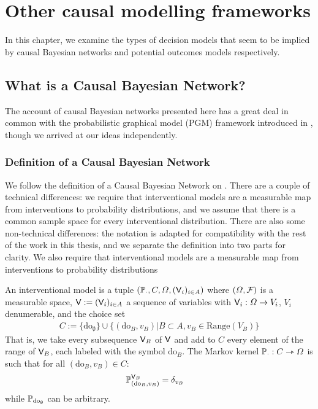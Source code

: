 
\chapter{Other causal modelling frameworks}\label{ch:other_causal_frameworks}

In this chapter, we examine the types of decision models that seem to be implied by causal Bayesian networks and potential outcomes models respectively. 

\section{What is a Causal Bayesian Network?}

The account of causal Bayesian networks presented here has a great deal in common with the probabilistic graphical model (PGM) framework introduced in \citet{lattimore_replacing_2019,lattimore_causal_2019}, though we arrived at our ideas independently. 

\subsection{Definition of a Causal Bayesian Network}

We follow the definition of a Causal Bayesian Network on \citet[page ~23-24]{pearl_causality:_2009}. There are a couple of technical differences: we require that interventional models are a measurable map from interventions to probability distributions, and we assume that there is a common sample space for every interventional distribution. There are also some non-technical differences: the notation is adapted for compatibility with the rest of the work in this thesis, and we separate the definition into two parts for clarity. We also require that interventional models are a measurable map from interventions to probability distributions

\begin{definition}
An interventional model is a tuple $(\mathbb{P}_\cdot,C,\Omega,(\mathsf{V}_i)_{i\in A})$ where $(\Omega,\mathcal{F})$ is a measurable space,  $\mathsf{V}:=(\mathsf{V}_i)_{i\in A}$ a sequence of variables with $\mathsf{V}_i:\Omega\to V_i$, $V_i$ denumerable, and the choice set
\begin{align}
    C:=\{\mathrm{do}_{\emptyset}\}\cup \{(\mathrm{do}_B,v_B)|B\subset A,v_B\in \mathrm{Range}(V_B)\}
\end{align}
That is, we take every subsequence $\mathsf{V}_B$ of $\mathsf{V}$ and add to $C$ every element of the range of $\mathsf{V}_B$, each labeled with the symbol $\mathrm{do}_B$. The Markov kernel $\mathbb{P}_\cdot:C\rightarrowtriangle \Omega$ is such that for all $(\mathrm{do}_{B},v_B)\in C$:
\begin{align}
    \mathbb{P}_{(\mathrm{do}_{B},v_B)}^{\mathsf{V}_B} &= \delta_{v_B}
\end{align}
while $\mathbb{P}_{\mathrm{do}_{\emptyset}}$ can be arbitrary.
\end{definition}

